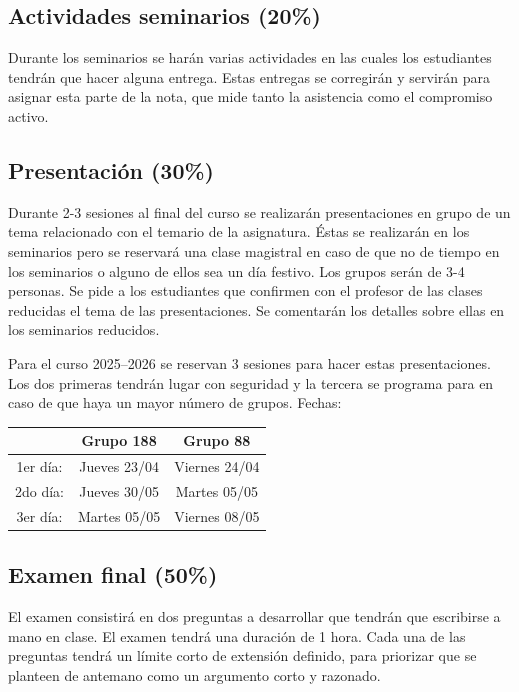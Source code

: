 \documentclass[12pt, a4paper]{article}
\begin{document}
\subsection*{Actividades seminarios (20\%)}

Durante los seminarios se harán varias actividades en las cuales los estudiantes tendrán que hacer alguna entrega. Estas entregas se corregirán y servirán para asignar esta parte de la nota, que mide tanto la asistencia como el compromiso activo.

\subsection*{Presentación (30\%)}

Durante 2-3 sesiones al final del curso se realizarán presentaciones en grupo de un tema relacionado con el temario de la asignatura. Éstas se realizarán en los seminarios pero se reservará una clase magistral en caso de que no de tiempo en los seminarios o alguno de ellos sea un día festivo. Los grupos serán de 3-4 personas. Se pide a los estudiantes que confirmen con el profesor de las clases reducidas el tema de las presentaciones. Se comentarán los detalles sobre ellas en los seminarios reducidos.

Para el curso 2025--2026 se reservan 3 sesiones para hacer estas presentaciones. Los dos primeras tendrán lugar con seguridad y la tercera se programa para en caso de que haya un mayor número de grupos. Fechas:

\begin{center}
\begin{tabular}{|c|c|c|}
\hline
& \textbf{Grupo 188} & \textbf{Grupo 88} \\
\hline
1er día: & Jueves 23/04 & Viernes 24/04 \\
2do día: & Jueves 30/05 & Martes 05/05 \\
3er día: & Martes 05/05 & Viernes 08/05 \\
\hline
\end{tabular}
\end{center}


\subsection*{Examen final (50\%)}

El examen consistirá en dos preguntas a desarrollar que tendrán que escribirse a mano en clase. El examen tendrá una duración de 1 hora. Cada una de las preguntas tendrá un límite corto de extensión definido, para priorizar que se planteen de antemano como un argumento corto y razonado.
\end{document}
